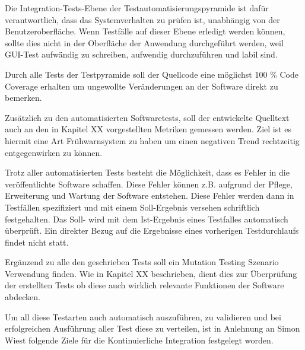 Die Integration-Tests-Ebene der Testautomatisierungspyramide ist dafür verantwortlich, dass das
Systemverhalten zu prüfen ist, unabhängig von der Benutzeroberfläche. Wenn Testfälle auf dieser
Ebene erledigt werden können, sollte dies nicht in der Oberfläche der Anwendung durchgeführt
werden, weil GUI-Test aufwändig zu schreiben, aufwendig durchzuführen und labil sind. 

Durch alle Tests der Testpyramide soll der Quellcode eine möglichst 100 \% Code Coverage erhalten um ungewollte Veränderungen an der Software direkt zu bemerken. 

Zusätzlich zu den automatisierten Softwaretests, soll der entwickelte Quelltext auch an den in Kapitel XX vorgestellten Metriken gemessen werden. Ziel ist es hiermit eine Art Frühwarnsystem zu haben um einen negativen Trend rechtzeitig entgegenwirken zu können.

Trotz aller automatisierten Tests besteht die Möglichkeit, dass es Fehler in die veröffentlichte Software schaffen. Diese Fehler können z.B. aufgrund der Pflege, Erweiterung und Wartung der Software entstehen. Diese Fehler werden dann in Testfällen spezifiziert und mit einem Soll-Ergebnis versehen schriftlich festgehalten. Das Soll- wird mit dem Ist-Ergebnis eines Testfalles automatisch überprüft. Ein direkter Bezug auf die Ergebnisse eines vorherigen Testdurchlaufs findet nicht statt.

Ergänzend zu alle den geschrieben Tests soll ein Mutation Testing Szenario Verwendung finden. Wie in Kapitel XX beschrieben, dient dies zur Überprüfung der erstellten Tests ob diese auch wirklich relevante Funktionen der Software abdecken.

Um all diese Testarten auch automatisch auszuführen, zu validieren und bei erfolgreichen Ausführung aller Test diese zu verteilen, ist in Anlehnung an Simon Wiest folgende Ziele für die Kontinuierliche Integration festgelegt worden.

